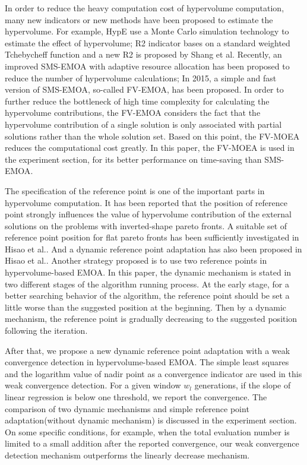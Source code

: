 \documentclass[conference]{IEEEtran}
\begin{document}
In order to reduce the heavy computation cost of hypervolume computation, 
many new indicators or new methods have been proposed to estimate the hypervolume. 
For example, HypE use a Monte Carlo simulation technology to estimate the effect of hypervolume\cite{HypE}; 
R2 indicator bases on a standard weighted Tchebycheff function\cite{R2} and a new R2 is proposed by Shang et al\cite{newR2}.
Recently, an improved SMS-EMOA with adaptive resource allocation has been proposed to reduce the number of hypervolume calculations\cite{ismsemoa}; 
In 2015, a simple and fast version of SMS-EMOA\cite{smsemoa}, so-called FV-EMOA, has been proposed\cite{FVEMOA}.
In order to further reduce the bottleneck of high time complexity for calculating the hypervolume contributions, 
the FV-EMOA considers the fact that the hypervolume contribution of a single solution 
is only associated with partial solutions rather than the whole solution set\cite{FVEMOA}. 
Based on this point, the FV-MOEA reduces the computational cost greatly. 
In this paper, the FV-MOEA is used in the experiment section, 
for its better performance on time-saving than SMS-EMOA\cite{FVEMOA}. 

The specification of the reference point is one of the important parts in hypervolume computation. 
It has been reported that the position of reference point strongly influences the value of
hypervolume contribution of the external solutions on the problems with inverted-shape pareto fronts\cite{hisao:RPhowtoSpecify, hisao:RPspecify, hisao:RPexplanation}. 
A suitable set of reference point position for flat pareto fronts has been sufficiently investigated in Hisao et al.\cite{hisao:RPspecify}.
And a dynamic reference point adaptation has also been proposed in Hisao et al.\cite{hisao:dynamic}.
Another strategy proposed is to use two reference points in hypervolume-based EMOA\cite{hisao:twoRP}. 
In this paper, the dynamic mechanism is stated in two different stages of the algorithm running process. 
At the early stage, for a better searching behavior of the algorithm, 
the reference point should be set a little worse than the suggested position at the beginning.
Then by a dynamic mechanism, the reference point is gradually decreasing to the suggested position following the iteration. 

After that, we propose a new dynamic reference point adaptation with a weak convergence detection in hypervolume-based EMOA. 
The simple least squares and the logarithm value of nadir point as a convergence indicator are used in this weak convergence detection. 
For a given window $w_l$ generations, if the slope of linear regression is below one threshold, we report the convergence.
The comparison of two dynamic mechanisms and simple reference point adaptation(without dynamic mechanism) is 
discussed in the experiment section. On some specific conditions, for example, when the total evaluation number 
is limited to a small addition after the reported convergence, our weak convergence detection mechanism 
outperforms the linearly decrease mechanism. 
\end{document}
